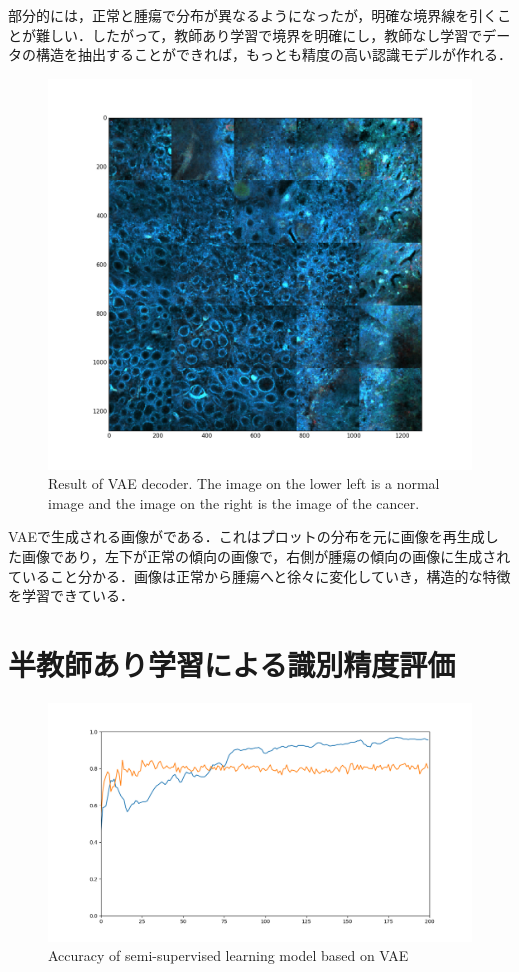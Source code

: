部分的には，正常と腫瘍で分布が異なるようになったが，明確な境界線を引くことが難しい．したがって，教師あり学習で境界を明確にし，教師なし学習でデータの構造を抽出することができれば，もっとも精度の高い認識モデルが作れる．

\begin{figure}[H]
	\centering
	\includegraphics[width=\linewidth]{fig/chapter4/vae_result_picture}
	\caption{Result of VAE decoder. The image on the lower left is a normal image and the image on the right is the image of the cancer.}
	\label{fig:vaeresultpicture}
\end{figure}

VAEで生成される画像がである．これはプロットの分布を元に画像を再生成した画像であり，左下が正常の傾向の画像で，右側が腫瘍の傾向の画像に生成されていること分かる．画像は正常から腫瘍へと徐々に変化していき，構造的な特徴を学習できている．


\section{半教師あり学習による識別精度評価}

\begin{figure}[H]
	\centering
	\includegraphics[width=0.8\linewidth]{fig/chapter4/accuracy_summary}
	\caption{Accuracy of semi-supervised learning model based on VAE}
	\label{fig:semiVAE_acc}
\end{figure}

